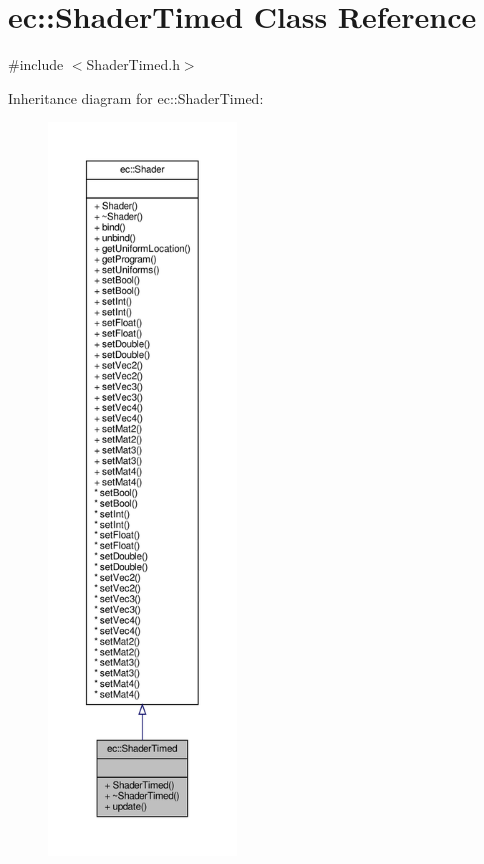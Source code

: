 \hypertarget{classec_1_1_shader_timed}{}\section{ec\+:\+:Shader\+Timed Class Reference}
\label{classec_1_1_shader_timed}


{\ttfamily \#include $<$Shader\+Timed.\+h$>$}



Inheritance diagram for ec\+:\+:Shader\+Timed\+:\nopagebreak
\begin{figure}[H]
\begin{center}
\leavevmode
\includegraphics[height=550pt]{classec_1_1_shader_timed__inherit__graph}
\end{center}
\end{figure}


